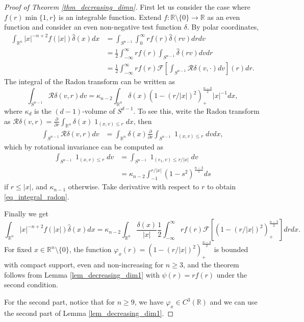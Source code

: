 \documentclass[10pt,a4paper]{amsart}
\def \R {\mathbb R}
\renewcommand {\chi}{\operatorname{1}}
\begin{document}
\begin{proof}[Proof of Theorem \ref{thm_decreasing_dimn}]
	First let us consider the case where $f(r) \min\{1, r\}$ is an integrable function.
	Extend $f:\R \setminus\{0\} \to \R$ as an even function and consider an even non-negative test function $\delta$. By polar coordinates,
\begin{align}
	\int_{\R^n} |x|^{-n+2} f(|x|) \hat \delta(x) d x
	&= \int_{S^{n-1}} \int_0^\infty r f(r) \hat \delta(r v) d r d v \\
	&= \frac 12 \int_{-\infty}^\infty r f(r) \int_{S^{n-1}} \hat \delta(r v) d v d r \\
	&= \frac 12 \int_{-\infty}^\infty r f(r) \mathcal F\left[ \int_{S^{n-1}}\mathcal R \delta (v,\cdot) dv \right](r) d r.
\end{align}
The integral of the Radon transform can be written as
	\begin{equation}
		\label{eq_integral_radon}
		\int_{S^{n-1}}\mathcal R \delta (v,r) dv = \kappa_{n-2} \int_{\R^n} \delta(x) ( 1 - (r/|x|)^2 )_+^{\frac{n-3}2} |x|^{-1} dx,
	\end{equation}
	where $\kappa_d$ is the $(d-1)$-volume of $S^{d-1}$.
	To see this, write the Radon transform as $\mathcal R \delta (v,r) = \frac{\partial}{\partial r} \int_{\R^n} \delta(x) \chi_{(x, v) \leq r} dx$, then
\begin{align}
	\int_{S^{n-1}}\mathcal R \delta (v,r) d v
	&= \int_{\R^n} \delta(x) \frac{\partial}{\partial r} \int_{S^{n-1}} \chi_{(x, v) \leq r} d v d x,
\end{align}
which by rotational invariance can be computed as
\begin{align}
	\int_{S^{n-1}} \chi_{(x, v) \leq r} d v
		&= \int_{S^{n-1}} \chi_{ (e_1, v) \leq r/|x|} d v \\
		&= \kappa_{n-2} \int_{-1}^{r/|x|} (1-s^2)^{\frac{n-3}2} d s
\end{align}
if $r \leq |x|$, and $\kappa_{n-1}$ otherwise.
Take derivative with respect to $r$ to obtain \eqref{eq_integral_radon}.

Finally we get
	\[\int_{\R^n} |x|^{-n+2} f(|x|) \hat \delta(x) dx = \kappa_{n-2} \int_{\R^n} \frac {\delta(x)}{|x|} \frac 12 \int_{-\infty}^\infty r f(r) \mathcal F[ ( 1 - (r/|x|)^2 )_+^{\frac{n-3}2}] dr dx.\]
	For fixed $x \in \R^n \setminus \{0\}$, the function $\varphi_x(r) = ( 1 - (r/|x|)^2 )_+^{\frac{n-3}2}$ is bounded with compact support, even and non-increasing for $n\geq 3$, and the theorem follows from Lemma \ref{lem_decreasing_dim1} with $\psi(r) = r f(r)$ under the second condition.

	For the second part, notice that for $n \geq 9$, we have $\varphi_x \in C^3(\R)$ and we can use the second part of Lemma \ref{lem_decreasing_dim1}.
\end{proof}
\end{document}
